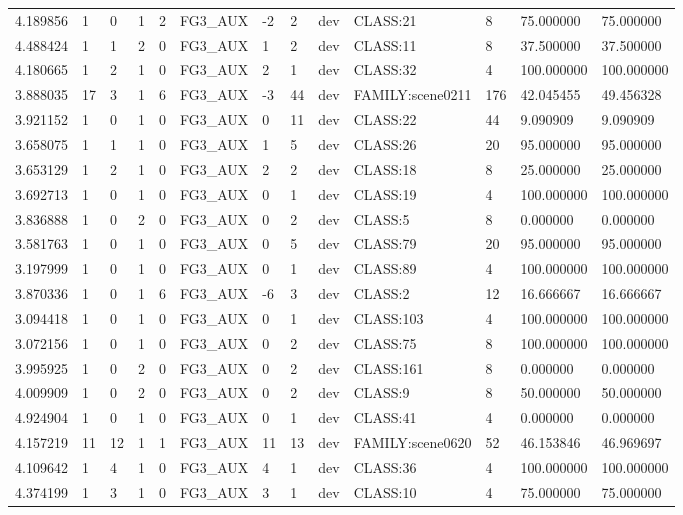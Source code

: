 \begin{tabular}{lllllllllllll}
4.189856 & 1 & 0 & 1 & 2 & FG3\_AUX & -2 & 2 & dev & CLASS:21 & 8 & 75.000000 & 75.000000 \\
4.488424 & 1 & 1 & 2 & 0 & FG3\_AUX & 1 & 2 & dev & CLASS:11 & 8 & 37.500000 & 37.500000 \\
4.180665 & 1 & 2 & 1 & 0 & FG3\_AUX & 2 & 1 & dev & CLASS:32 & 4 & 100.000000 & 100.000000 \\
3.888035 & 17 & 3 & 1 & 6 & FG3\_AUX & -3 & 44 & dev & FAMILY:scene0211 & 176 & 42.045455 & 49.456328 \\
3.921152 & 1 & 0 & 1 & 0 & FG3\_AUX & 0 & 11 & dev & CLASS:22 & 44 & 9.090909 & 9.090909 \\
3.658075 & 1 & 1 & 1 & 0 & FG3\_AUX & 1 & 5 & dev & CLASS:26 & 20 & 95.000000 & 95.000000 \\
3.653129 & 1 & 2 & 1 & 0 & FG3\_AUX & 2 & 2 & dev & CLASS:18 & 8 & 25.000000 & 25.000000 \\
3.692713 & 1 & 0 & 1 & 0 & FG3\_AUX & 0 & 1 & dev & CLASS:19 & 4 & 100.000000 & 100.000000 \\
3.836888 & 1 & 0 & 2 & 0 & FG3\_AUX & 0 & 2 & dev & CLASS:5 & 8 & 0.000000 & 0.000000 \\
3.581763 & 1 & 0 & 1 & 0 & FG3\_AUX & 0 & 5 & dev & CLASS:79 & 20 & 95.000000 & 95.000000 \\
3.197999 & 1 & 0 & 1 & 0 & FG3\_AUX & 0 & 1 & dev & CLASS:89 & 4 & 100.000000 & 100.000000 \\
3.870336 & 1 & 0 & 1 & 6 & FG3\_AUX & -6 & 3 & dev & CLASS:2 & 12 & 16.666667 & 16.666667 \\
3.094418 & 1 & 0 & 1 & 0 & FG3\_AUX & 0 & 1 & dev & CLASS:103 & 4 & 100.000000 & 100.000000 \\
3.072156 & 1 & 0 & 1 & 0 & FG3\_AUX & 0 & 2 & dev & CLASS:75 & 8 & 100.000000 & 100.000000 \\
3.995925 & 1 & 0 & 2 & 0 & FG3\_AUX & 0 & 2 & dev & CLASS:161 & 8 & 0.000000 & 0.000000 \\
4.009909 & 1 & 0 & 2 & 0 & FG3\_AUX & 0 & 2 & dev & CLASS:9 & 8 & 50.000000 & 50.000000 \\
4.924904 & 1 & 0 & 1 & 0 & FG3\_AUX & 0 & 1 & dev & CLASS:41 & 4 & 0.000000 & 0.000000 \\
4.157219 & 11 & 12 & 1 & 1 & FG3\_AUX & 11 & 13 & dev & FAMILY:scene0620 & 52 & 46.153846 & 46.969697 \\
4.109642 & 1 & 4 & 1 & 0 & FG3\_AUX & 4 & 1 & dev & CLASS:36 & 4 & 100.000000 & 100.000000 \\
4.374199 & 1 & 3 & 1 & 0 & FG3\_AUX & 3 & 1 & dev & CLASS:10 & 4 & 75.000000 & 75.000000 \\

\end{tabular}
